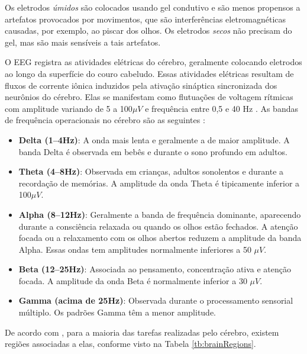 			\par Os eletrodos \textit{úmidos} são colocados usando gel condutivo e são menos propensos a artefatos provocados por movimentos, que são interferências eletromagnéticas causadas, por exemplo, ao piscar dos olhos. Os eletrodos \textit{secos} não precisam do gel, mas são mais sensíveis a tais artefatos.
			
			\par O EEG registra as atividades elétricas do cérebro, geralmente colocando eletrodos ao longo da superfície do couro cabeludo. Essas atividades elétricas resultam de fluxos de corrente iônica induzidos pela ativação sináptica sincronizada dos neurônios do cérebro. Elas se manifestam como flutuações de voltagem rítmicas com amplitude variando de 5 a 100$\mu V$ e frequência entre 0,5 e 40 Hz \cite{JALALYBIDGOLY2020101788}. As bandas de frequência operacionais no cérebro são as seguintes \cite{sanei2021eeg}:
			
			\begin{itemize}
				\item \textbf{Delta (1–4Hz)}: A onda mais lenta e geralmente a de maior amplitude. A banda Delta é observada em bebês e durante o sono profundo em adultos.
				
				\item \textbf{Theta (4–8Hz)}: Observada em crianças, adultos sonolentos e durante a recordação de memórias. A amplitude da onda Theta é tipicamente inferior a 100$\mu V$.
				
				\item \textbf{Alpha (8–12Hz)}: Geralmente a banda de frequência dominante, aparecendo durante a consciência relaxada ou quando os olhos estão fechados. A atenção focada ou a relaxamento com os olhos abertos reduzem a amplitude da banda Alpha. Essas ondas tem amplitudes normalmente inferiores a 50 $\mu V$.
				
				\item \textbf{Beta (12–25Hz)}: Associada ao pensamento, concentração ativa e atenção focada. A amplitude da onda Beta é normalmente inferior a 30 $\mu V$.
				
				\item \textbf{Gamma (acima de 25Hz)}: Observada durante o processamento sensorial múltiplo. Os padrões Gamma têm a menor amplitude.
				
			\end{itemize}
			
			\par De acordo com \cite{JALALYBIDGOLY2020101788}, para a maioria das tarefas realizadas pelo cérebro, existem regiões associadas a elas, conforme visto na Tabela \autoref{tb:brainRegions}.
			
